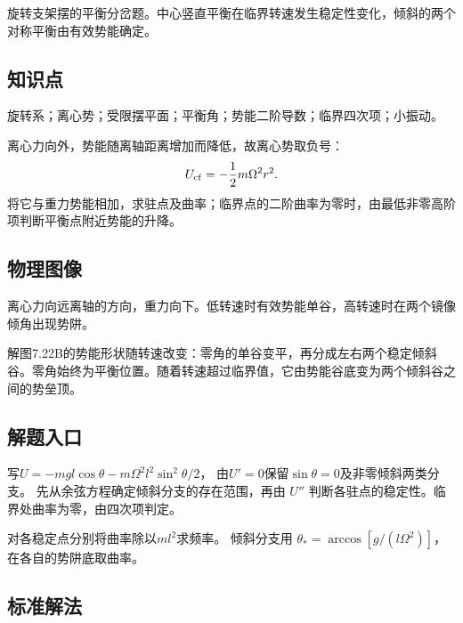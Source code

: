 \documentclass[UTF8,fontset=fandol,a4paper,11pt]{ctexart}
\begin{document}
旋转支架摆的平衡分岔题。中心竖直平衡在临界转速发生稳定性变化，倾斜的两个对称平衡由有效势能确定。



\subsection*{知识点}

旋转系；离心势；受限摆平面；平衡角；势能二阶导数；临界四次项；小振动。

离心力向外，势能随离轴距离增加而降低，故离心势取负号：
\[U_{\rm cf}=-\frac12m\Omega^2r^2.\]
将它与重力势能相加，求驻点及曲率；临界点的二阶曲率为零时，由最低非零高阶项判断平衡点附近势能的升降。




\subsection*{物理图像}

离心力向远离轴的方向，重力向下。低转速时有效势能单谷，高转速时在两个镜像倾角出现势阱。

解图7.22B的势能形状随转速改变：零角的单谷变平，再分成左右两个稳定倾斜谷。零角始终为平衡位置。随着转速超过临界值，它由势能谷底变为两个倾斜谷之间的势垒顶。




\subsection*{解题入口}

写$U=-mgl\cos\theta-m\Omega^2l^2\sin^2\theta/2$，
由$U'=0$保留$\sin\theta=0$及非零倾斜两类分支。
先从余弦方程确定倾斜分支的存在范围，再由 $U''$ 判断各驻点的稳定性。临界处曲率为零，由四次项判定。

对各稳定点分别将曲率除以$ml^2$求频率。
倾斜分支用 $\theta_*=\arccos[g/(l\Omega^2)]$，在各自的势阱底取曲率。



\subsection*{标准解法}
\end{document}
